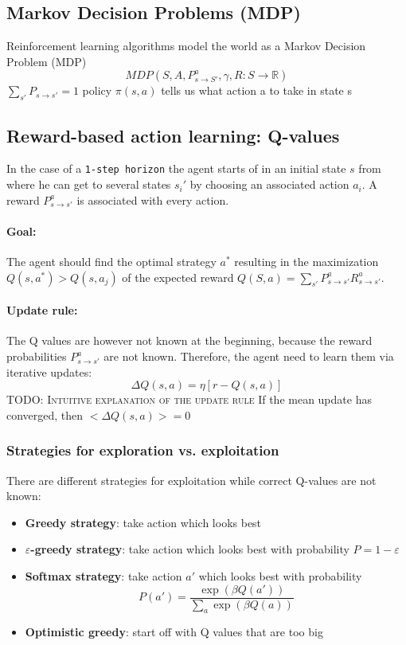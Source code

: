 \documentclass[11pt]{article}
\begin{document}
\subsection{Markov Decision Problems (MDP)}
Reinforcement learning algorithms model the world as a Markov Decision Problem (MDP) 
\[
MDP(S, A, P_{s\rightarrow S'}^a, \gamma, R:S\rightarrow\mathbb{R})
\]
$\sum_{s'}P_{s\rightarrow s'}=1$
policy $\pi(s,a)$ tells us what action a to take in state s
\subsection{Reward-based action learning: Q-values}
In the case of a \texttt{1-step horizon} the agent starts of in an initial state $s$ from where he can get to several states $s_i'$ by choosing an associated action $a_i$. A reward $P_{s \rightarrow s'}^a$ is associated with every action.
\paragraph{Goal:} The agent should find the optimal strategy $a^*$ resulting in the maximization $Q(s,a^*) > Q(s, a_j)$ of the expected reward $Q(S,a)=\sum_{s'} P_{s \rightarrow s'}^a R_{s \rightarrow s'}^a$.

\paragraph{Update rule:}
The Q values are however not known at the beginning, because the reward probabilities $P_{s \rightarrow s'}^a$ are not known. Therefore, the agent need to learn them via iterative updates: 
\[
\Delta Q(s,a) = \eta [r-Q(s,a)]
\]
\textsc{TODO: Intuitive explanation of the update rule}
If the mean update has converged, then $<\Delta Q(s,a)> = 0$

\subsubsection{Strategies for exploration vs. exploitation}
There are different strategies for exploitation while correct Q-values are not known:
\begin{itemize}
	\item \textbf{Greedy strategy}: take action which looks best
	\item \textbf{$\varepsilon$-greedy strategy}: take action which looks best with probability $P = 1-\varepsilon$
	\item \textbf{Softmax strategy}: take action $a'$ which looks best with probability 
	\[
	P(a') = \frac{\exp{(\beta Q(a'))}}{\sum_a \exp{(\beta Q(a))}}
	\]
	\item \textbf{Optimistic greedy}: start off with Q values that are too big
\end{itemize}
\end{document}
